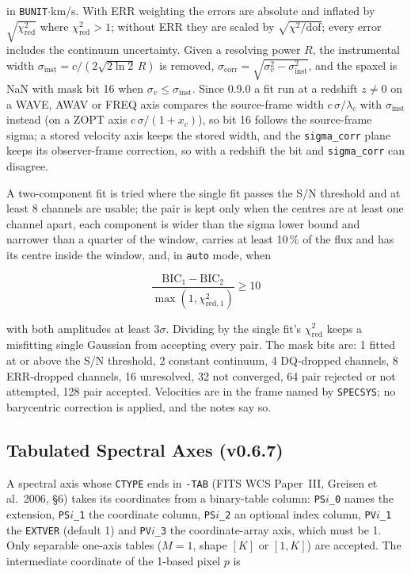 \documentclass[11pt,a4paper]{article}
\newcommand{\code}[1]{\texttt{\small #1}}
\begin{document}
    in \code{BUNIT}$\cdot$km/s. With ERR weighting the errors are absolute and inflated by $\sqrt{\chi^2_{\text{red}}}$ where $\chi^2_{\text{red}} > 1$; without ERR they are scaled by $\sqrt{\chi^2/\text{dof}}$; every error includes the continuum uncertainty. Given a resolving power $R$, the instrumental width $\sigma_{\text{inst}} = c / (2\sqrt{2 \ln 2}\, R)$ is removed, $\sigma_{\text{corr}} = \sqrt{\sigma_v^2 - \sigma_{\text{inst}}^2}$, and the spaxel is NaN with mask bit 16 when $\sigma_v \le \sigma_{\text{inst}}$. Since 0.9.0 a fit run at a redshift $z \ne 0$ on a WAVE, AWAV or FREQ axis compares the source-frame width $c\,\sigma/\lambda_c$ with $\sigma_{\text{inst}}$ instead (on a ZOPT axis $c\,\sigma/(1 + x_c)$), so bit 16 follows the source-frame sigma; a stored velocity axis keeps the stored width, and the \code{sigma\_corr} plane keeps its observer-frame correction, so with a redshift the bit and \code{sigma\_corr} can disagree.

    A two-component fit is tried where the single fit passes the S/N threshold and at least 8 channels are usable; the pair is kept only when the centres are at least one channel apart, each component is wider than the sigma lower bound and narrower than a quarter of the window, carries at least 10\,\% of the flux and has its centre inside the window, and, in \code{auto} mode, when

    \begin{equation}
        \frac{\text{BIC}_1 - \text{BIC}_2}{\max(1, \chi^2_{\text{red},1})} \ge 10
    \end{equation}

    with both amplitudes at least $3\sigma$. Dividing by the single fit's $\chi^2_{\text{red}}$ keeps a misfitting single Gaussian from accepting every pair. The mask bits are: 1 fitted at or above the S/N threshold, 2 constant continuum, 4 DQ-dropped channels, 8 ERR-dropped channels, 16 unresolved, 32 not converged, 64 pair rejected or not attempted, 128 pair accepted. Velocities are in the frame named by \code{SPECSYS}; no barycentric correction is applied, and the notes say so.

    \subsection{Tabulated Spectral Axes (v0.6.7)}
    \label{sec:tab_math}

    A spectral axis whose \code{CTYPE} ends in \code{-TAB} (FITS WCS Paper~III, Greisen et al.\ 2006, \S 6) takes its coordinates from a binary-table column: \code{PS$i$\_0} names the extension, \code{PS$i$\_1} the coordinate column, \code{PS$i$\_2} an optional index column, \code{PV$i$\_1} the \code{EXTVER} (default 1) and \code{PV$i$\_3} the coordinate-array axis, which must be 1. Only separable one-axis tables ($M = 1$, shape $[K]$ or $[1, K]$) are accepted. The intermediate coordinate of the 1-based pixel $p$ is
\end{document}
